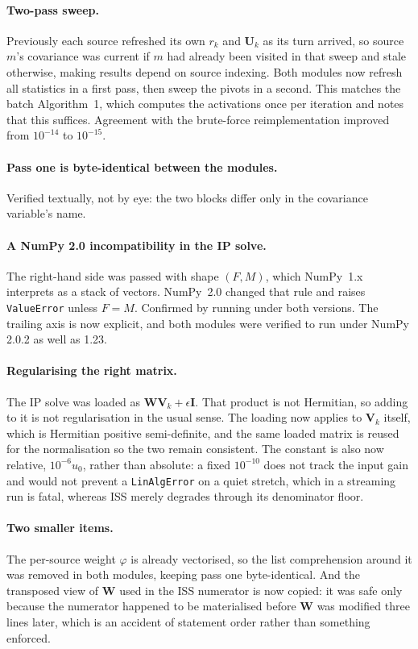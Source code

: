 \documentclass[11pt,a4paper]{article}
\newcommand{\W}{\boldsymbol{W}}
\newcommand{\V}{\boldsymbol{V}}
\newcommand{\U}{\boldsymbol{U}}
\begin{document}
\paragraph{Two-pass sweep.} Previously each source refreshed its own $r_k$ and
$\U_k$ as its turn arrived, so source $m$'s covariance was current if $m$ had
already been visited in that sweep and stale otherwise, making results depend on
source indexing. Both modules now refresh all statistics in a first pass, then
sweep the pivots in a second. This matches the batch Algorithm~1, which computes
the activations once per iteration and notes that this suffices. Agreement with
the brute-force reimplementation improved from $10^{-14}$ to $10^{-15}$.

\paragraph{Pass one is byte-identical between the modules.} Verified textually,
not by eye: the two blocks differ only in the covariance variable's name.

\paragraph{A NumPy 2.0 incompatibility in the IP solve.} The right-hand side was
passed with shape $(F, M)$, which NumPy~1.x interprets as a stack of vectors.
NumPy~2.0 changed that rule and raises \texttt{ValueError} unless $F = M$.
Confirmed by running under both versions. The trailing axis is now explicit, and
both modules were verified to run under NumPy 2.0.2 as well as 1.23.


\paragraph{Regularising the right matrix.} The IP solve was loaded as
$\W\V_k + \epsilon\boldsymbol{I}$. That product is not Hermitian, so adding to it
is not regularisation in the usual sense. The loading now applies to $\V_k$
itself, which is Hermitian positive semi-definite, and the same loaded matrix is
reused for the normalisation so the two remain consistent. The constant is also
now relative, $10^{-6}u_0$, rather than absolute: a fixed $10^{-10}$ does not
track the input gain and would not prevent a \texttt{LinAlgError} on a quiet
stretch, which in a streaming run is fatal, whereas ISS merely degrades through
its denominator floor.

\paragraph{Two smaller items.} The per-source weight $\varphi$ is already
vectorised, so the list comprehension around it was removed in both modules,
keeping pass one byte-identical. And the transposed view of $\W$ used in the ISS
numerator is now copied: it was safe only because the numerator happened to be
materialised before $\W$ was modified three lines later, which is an accident of
statement order rather than something enforced.
\end{document}
